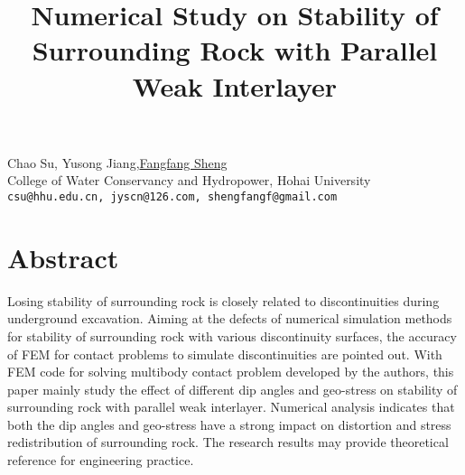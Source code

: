 \title{Numerical Study on Stability of Surrounding Rock with Parallel Weak Interlayer}
\author{} \institute{}
\maketitle

\begin{center}
{\large Chao Su, Yusong Jiang,\underline{Fangfang Sheng}}\\
College of Water Conservancy and Hydropower, Hohai University\\
{\tt csu@hhu.edu.cn, jyscn@126.com, shengfangf@gmail.com}
\end{center}

\section*{Abstract}
Losing stability of surrounding rock is closely related to discontinuities during underground excavation. Aiming at the defects of numerical simulation methods for stability of surrounding rock with various discontinuity surfaces, the accuracy of FEM for contact problems to simulate discontinuities are pointed out. With FEM code for solving multibody contact problem developed by the authors, this paper mainly study the effect of different dip angles and geo-stress on stability of surrounding rock with parallel weak interlayer. Numerical analysis indicates that both the dip angles and geo-stress have a strong impact on distortion and stress redistribution of surrounding rock. The research results may provide theoretical reference for engineering practice.

